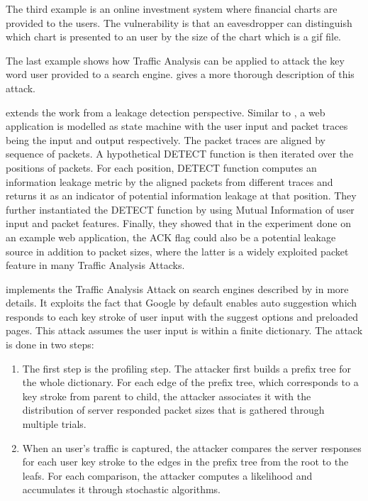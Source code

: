 \begin{example}
	The third example is an online investment system where financial charts are provided to the users. The vulnerability is that an eavesdropper can distinguish which chart is presented to an user by the size of the chart which is a gif file. 
\end{example}

\begin{example}
	The last example shows how Traffic Analysis can be applied to attack the key word user provided to a search engine. \cite{SearchAttack} gives a more thorough description of this attack.
\end{example}

\cite{PinpointWeb} extends the work from a leakage detection perspective. Similar to \cite{WebSideChannel}, a web application is modelled as state machine with the user input and packet traces being the input and output respectively. The packet traces are aligned by sequence of packets. A hypothetical DETECT function is then iterated over the positions of packets. For each position, DETECT function computes an information leakage metric by the aligned packets from different traces and returns it as an indicator of potential information leakage at that position. They further instantiated the DETECT function by using Mutual Information of user input and packet features. Finally, they showed that in the experiment done on an example web application, the ACK flag could also be a potential leakage source in addition to packet sizes, where the latter is a widely exploited packet feature in many Traffic Analysis Attacks.

\cite{SearchAttack} implements the Traffic Analysis Attack on search engines described by \cite{WebSideChannel} in more details. It exploits the fact that Google by default enables auto suggestion which responds to each key stroke of user input with the suggest options and preloaded pages. This attack assumes the user input is within a finite dictionary. The attack is done in two steps:

\begin{enumerate}
	\item The first step is the profiling step. The attacker first builds a prefix tree\cite{PrefixTree} for the whole dictionary. For each edge of the prefix tree, which corresponds to a key stroke from parent to child, the attacker associates it with the distribution of server responded packet sizes that is gathered through multiple trials. 
	\item When an user's traffic is captured, the attacker compares the server responses for each user key stroke to the edges in the prefix tree from the root to the leafs. For each comparison, the attacker computes a likelihood and accumulates it through stochastic algorithms. 
\end{enumerate}

